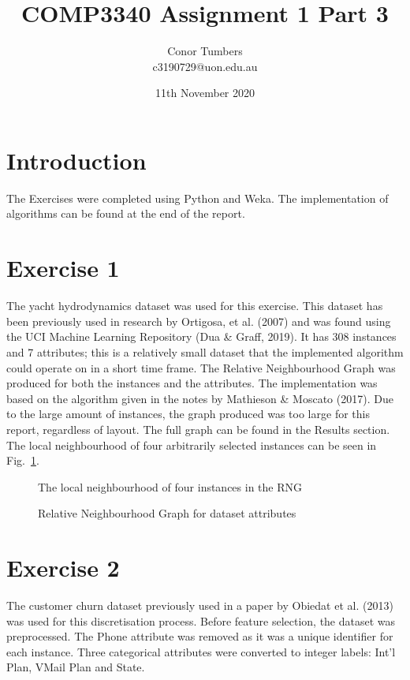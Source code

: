 \documentclass[11pt, a4paper]{article}
\title{\vspace{-2.0cm} COMP3340 Assignment 1 Part 3}
\date{11th November 2020}
\author{Conor Tumbers \\ c3190729@uon.edu.au}
\begin{document}
\maketitle 

\section{Introduction}
The Exercises were completed using Python and Weka. The implementation of algorithms can be found at the end of the report.

\section{Exercise 1}
The yacht hydrodynamics dataset was used for this exercise. This dataset has been previously used in research by Ortigosa, et al. (2007) and was found using the UCI Machine Learning Repository (Dua \& Graff, 2019). It has 308 instances and 7 attributes; this is a relatively small dataset that the implemented algorithm could operate on in a short time frame. The Relative Neighbourhood Graph was produced for both the instances and the attributes. The implementation was based on the algorithm given in the notes by Mathieson \& Moscato (2017). Due to the large amount of instances, the graph produced was too large for this report, regardless of layout. The full graph can be found in the Results section. The local neighbourhood of four arbitrarily selected instances can be seen in Fig.~\ref{fig1a}.

\begin{figure}[H]
\caption{The local neighbourhood of four instances in the RNG}\label{fig1a}
\end{figure}

\begin{figure}[H]
\caption{Relative Neighbourhood Graph for dataset attributes}\label{fig1b}
\end{figure}

\section{Exercise 2}
The customer churn dataset previously used in a paper by Obiedat et al. (2013) was used for this discretisation process. Before feature selection, the dataset was preprocessed. The Phone attribute was removed as it was a unique identifier for each instance. Three categorical attributes were converted to integer labels: Int'l Plan, VMail Plan and State.
\end{document}
